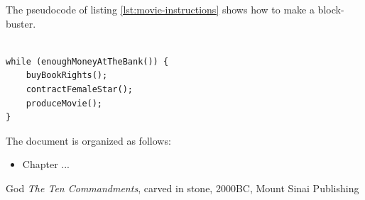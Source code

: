 \documentclass[11pt,twoside,a4paper,pagesize]{report}
\begin{document}
The pseudocode of listing \ref{lst:movie-instructions} shows how to
make a block-buster.

\lstset{language=Java}
\begin{lstlisting}[float, frame=single, caption=How to make a block-buster, label=lst:movie-instructions]

while (enoughMoneyAtTheBank()) {
    buyBookRights();
    contractFemaleStar();
    produceMovie();
}
\end{lstlisting}


\clearpage

The document is organized as follows:
\begin{itemize}
\item Chapter ... 
\end{itemize}





\renewcommand{\bibname}{References}

\begin{thebibliography}{1}
    God {\em The Ten Commandments}, carved in stone, 2000BC, Mount Sinai Publishing
\end{thebibliography}
\end{document}
